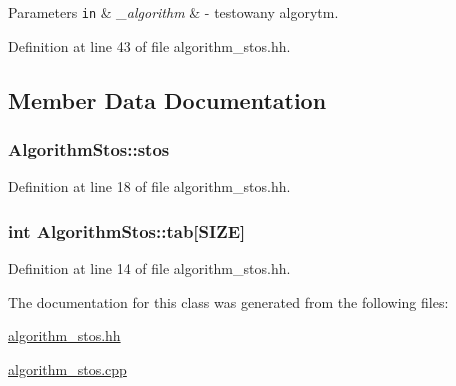 \begin{DoxyParams}[1]{Parameters}
\mbox{\tt in}  & {\em \+\_\+algorithm} & -\/ testowany algorytm. \\
\hline
\end{DoxyParams}


Definition at line 43 of file algorithm\+\_\+stos.\+hh.



\subsection{Member Data Documentation}
\hypertarget{class_algorithm_stos_a0b803ecc25fd3586cf07969697367754}{}
\subsubsection[{stos}]{ Algorithm\+Stos\+::stos\hspace{0.3cm}{\ttfamily [private]}}\label{class_algorithm_stos_a0b803ecc25fd3586cf07969697367754}


Definition at line 18 of file algorithm\+\_\+stos.\+hh.

\hypertarget{class_algorithm_stos_a2fb5db929aa54bf64794c812830d8648}{}
\subsubsection[{tab}]{\setlength{\rightskip}{0pt plus 5cm}int Algorithm\+Stos\+::tab\mbox{[}{\bf S\+I\+Z\+E}\mbox{]}\hspace{0.3cm}{\ttfamily [private]}}\label{class_algorithm_stos_a2fb5db929aa54bf64794c812830d8648}


Definition at line 14 of file algorithm\+\_\+stos.\+hh.



The documentation for this class was generated from the following files\+:\begin{DoxyCompactItemize}
\item 
\hyperlink{algorithm__stos_8hh}{algorithm\+\_\+stos.\+hh}\item 
\hyperlink{algorithm__stos_8cpp}{algorithm\+\_\+stos.\+cpp}\end{DoxyCompactItemize}
